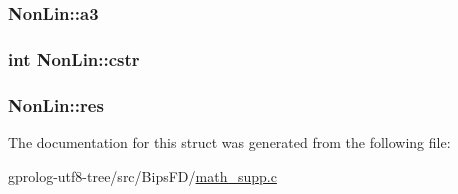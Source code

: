 \subsubsection[{\texorpdfstring{a3}{a3}}]{ Non\+Lin\+::a3}\hypertarget{structNonLin_a3e4eeac9f54cd48366e50824833a9271}{}\label{structNonLin_a3e4eeac9f54cd48366e50824833a9271}
\subsubsection[{\texorpdfstring{cstr}{cstr}}]{\setlength{\rightskip}{0pt plus 5cm}int Non\+Lin\+::cstr}\hypertarget{structNonLin_ace702860218e3fed62bb3235547358aa}{}\label{structNonLin_ace702860218e3fed62bb3235547358aa}
\subsubsection[{\texorpdfstring{res}{res}}]{ Non\+Lin\+::res}\hypertarget{structNonLin_af8f4e398e6c9371309ae73d04456f4f0}{}\label{structNonLin_af8f4e398e6c9371309ae73d04456f4f0}


The documentation for this struct was generated from the following file\+:\begin{DoxyCompactItemize}
\item 
gprolog-\/utf8-\/tree/src/\+Bips\+F\+D/\hyperlink{math__supp_8c}{math\+\_\+supp.\+c}\end{DoxyCompactItemize}
